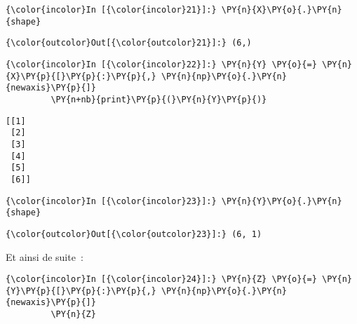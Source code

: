     \begin{Verbatim}[commandchars=\\\{\},frame=single,framerule=0.3mm,rulecolor=\color{cellframecolor}]
{\color{incolor}In [{\color{incolor}21}]:} \PY{n}{X}\PY{o}{.}\PY{n}{shape}
\end{Verbatim}


\begin{Verbatim}[commandchars=\\\{\},frame=single,framerule=0.3mm,rulecolor=\color{cellframecolor}]
{\color{outcolor}Out[{\color{outcolor}21}]:} (6,)
\end{Verbatim}
            
    \begin{Verbatim}[commandchars=\\\{\},frame=single,framerule=0.3mm,rulecolor=\color{cellframecolor}]
{\color{incolor}In [{\color{incolor}22}]:} \PY{n}{Y} \PY{o}{=} \PY{n}{X}\PY{p}{[}\PY{p}{:}\PY{p}{,} \PY{n}{np}\PY{o}{.}\PY{n}{newaxis}\PY{p}{]}
         \PY{n+nb}{print}\PY{p}{(}\PY{n}{Y}\PY{p}{)}
\end{Verbatim}


    \begin{Verbatim}[commandchars=\\\{\},frame=single,framerule=0.3mm,rulecolor=\color{cellframecolor}]
[[1]
 [2]
 [3]
 [4]
 [5]
 [6]]
\end{Verbatim}

    \begin{Verbatim}[commandchars=\\\{\},frame=single,framerule=0.3mm,rulecolor=\color{cellframecolor}]
{\color{incolor}In [{\color{incolor}23}]:} \PY{n}{Y}\PY{o}{.}\PY{n}{shape}
\end{Verbatim}


\begin{Verbatim}[commandchars=\\\{\},frame=single,framerule=0.3mm,rulecolor=\color{cellframecolor}]
{\color{outcolor}Out[{\color{outcolor}23}]:} (6, 1)
\end{Verbatim}
            
    Et ainsi de suite~:

    \begin{Verbatim}[commandchars=\\\{\},frame=single,framerule=0.3mm,rulecolor=\color{cellframecolor}]
{\color{incolor}In [{\color{incolor}24}]:} \PY{n}{Z} \PY{o}{=} \PY{n}{Y}\PY{p}{[}\PY{p}{:}\PY{p}{,} \PY{n}{np}\PY{o}{.}\PY{n}{newaxis}\PY{p}{]}
         \PY{n}{Z}
\end{Verbatim}



